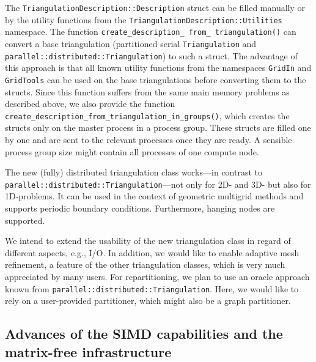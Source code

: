 \documentclass{ansarticle-preprint}
\begin{document}
The \texttt{TriangulationDescription::Description} struct can be filled manually or 
by the utility functions from the \texttt{TriangulationDescription::Utilities} 
namespace. The function \texttt{create\_\allowbreak description\_\allowbreak 
from\_ \allowbreak triangulation()} can convert a base triangulation (partitioned 
serial \texttt{Tri\-angulation} and \texttt{parallel::distributed::Triangulation}) 
to such a struct. The advantage of this approach is that all known utility 
functions from the namespaces \texttt{GridIn} and \texttt{GridTools} can be used 
on the base triangulations before converting them to the structs. Since this 
function suffers from the same main memory problems as described above, we also 
provide the function \texttt{create\_description\_from\_triangulation\_in\_groups()}, 
which creates the structs only on the master process in a process group. These 
structs are filled one by one and are sent to the relevant processes once they are 
ready. A sensible process group size might contain all processes of one compute node.


The new (fully) distributed triangulation class works---in contrast to  
\texttt{parallel::distributed::\allowbreak Tri\-an\-gu\-la\-tion}---not only for 2D- and 3D- but also for 
1D-problems. It can be used in the context of geometric multigrid methods and 
supports periodic boundary conditions. Furthermore, hanging nodes are supported.

We intend to extend the usability of the new triangulation class in regard of 
different aspects, e.g., I/O. In addition, we would like to enable adaptive mesh 
refinement, a feature of the other triangulation classes, which is very much 
appreciated by many users. For repartitioning, we plan to use an oracle approach 
known from \texttt{parallel::distributed::Triangulation}. Here, we would like to 
rely on a user-provided partitioner, which might also be a graph partitioner.


\subsection{Advances of the SIMD capabilities and the matrix-free infrastructure}
\label{subsec:mf}

\end{document}
